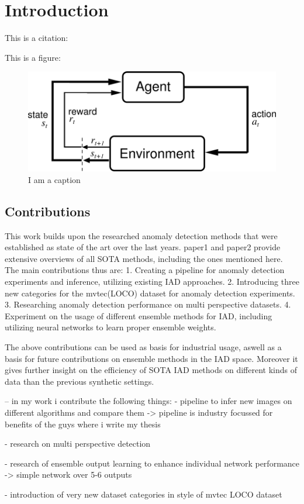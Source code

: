 \chapter{Introduction}
\label{chap:introduction}
This is a citation: \cite{Vaswani2017}


This is a figure: 

\begin{figure}[ht]
    \centering
    \includegraphics[width=.5\textwidth]{figures/AgentEnviornment.png}
    \caption{I am a caption}
    \label{fig:my_label}
\end{figure}








\section{Contributions}
This work builds upon the researched anomaly detection methods that were established as state of the art over the last years. paper1 and paper2 provide extensive overviews of all SOTA methods,
including the ones mentioned here. The main contributions thus are:
1. Creating a pipeline for anomaly detection experiments and inference, utilizing existing IAD approaches. 
2. Introducing three new categories for the mvtec(LOCO) dataset for anomaly detection experiments.
3. Researching anomaly detection performance on multi perspective datasets.
4. Experiment on the usage of different ensemble methods for IAD, including utilizing neural networks to learn proper ensemble weights.

The above contributions can be used as basis for industrial usage, aswell as a basis for future contributions on ensemble methods in the IAD space. Moreover it gives further insight on the
efficiency of SOTA IAD methods on different kinds of data than the previous synthetic settings.



-- in my work i contribute the following things:
- pipeline to infer new images on different algorithms and compare them
-> pipeline is industry focussed for benefits of the guys where i write my thesis

- research on multi perspective detection

- research of ensemble output learning to enhance individual network performance
-> simple network over 5-6 outputs

- introduction of very new dataset categories in style of mvtec LOCO dataset


